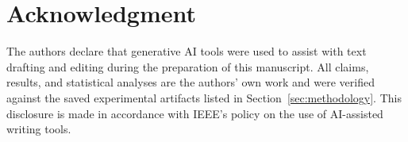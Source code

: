 \documentclass[journal]{IEEEtran}
\begin{document}
\section*{Acknowledgment}

The authors declare that generative AI tools were used to assist with text
drafting and editing during the preparation of this manuscript. All claims,
results, and statistical analyses are the authors' own work and were verified
against the saved experimental artifacts listed in Section~\ref{sec:methodology}.
This disclosure is made in accordance with IEEE's policy on the use of AI-assisted
writing tools.




\end{document}
